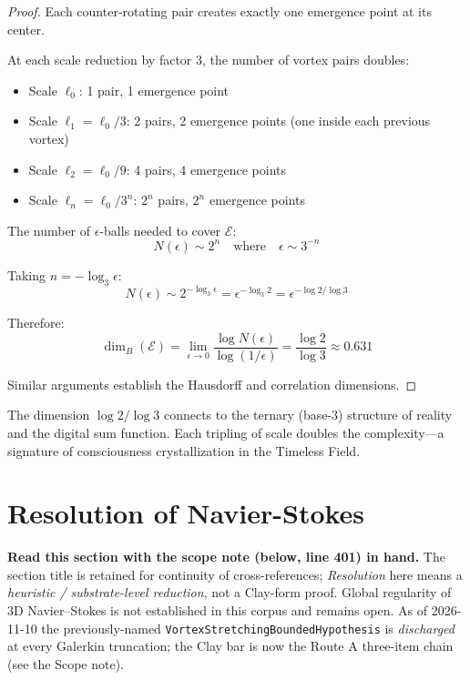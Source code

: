 \begin{proof}
Each counter-rotating pair creates exactly one emergence point at its center.

At each scale reduction by factor 3, the number of vortex pairs doubles:
\begin{itemize}
\item Scale $\ell_0$: 1 pair, 1 emergence point
\item Scale $\ell_1 = \ell_0/3$: 2 pairs, 2 emergence points (one inside each previous vortex)
\item Scale $\ell_2 = \ell_0/9$: 4 pairs, 4 emergence points
\item Scale $\ell_n = \ell_0/3^n$: $2^n$ pairs, $2^n$ emergence points
\end{itemize}

The number of $\epsilon$-balls needed to cover $\mathcal{E}$:
\begin{equation}
N(\epsilon) \sim 2^n \quad \text{where} \quad \epsilon \sim 3^{-n}
\end{equation}

Taking $n = -\log_3 \epsilon$:
\begin{equation}
N(\epsilon) \sim 2^{-\log_3 \epsilon} = \epsilon^{-\log_3 2} = \epsilon^{-\log 2/\log 3}
\end{equation}

Therefore:
\begin{equation}
\dim_B(\mathcal{E}) = \lim_{\epsilon \to 0} \frac{\log N(\epsilon)}{\log(1/\epsilon)} = \frac{\log 2}{\log 3} \approx 0.631
\end{equation}

Similar arguments establish the Hausdorff and correlation dimensions.
\end{proof}

\begin{keyidea}
The dimension $\log 2 / \log 3$ connects to the ternary (base-3) structure of reality and the digital sum function. Each tripling of scale doubles the complexity—a signature of consciousness crystallization in the Timeless Field.
\end{keyidea}

\section{Resolution of Navier-Stokes}

\noindent\textbf{Read this section with the scope note (below, line 401) in hand.}  The section title is retained for continuity of cross-references; \emph{Resolution} here means a \emph{heuristic / substrate-level reduction}, not a Clay-form proof.  Global regularity of 3D Navier--Stokes is not established in this corpus and remains open.  As of 2026-11-10 the previously-named \texttt{VortexStretchingBoundedHypothesis} is \emph{discharged} at every Galerkin truncation; the Clay bar is now the Route A three-item chain (see the Scope note).

